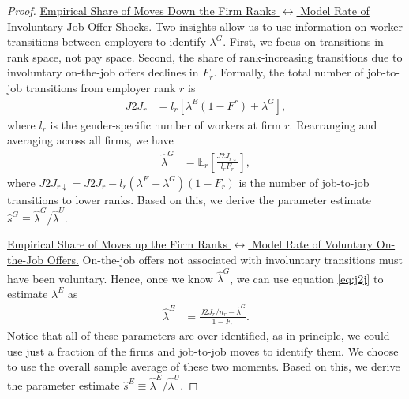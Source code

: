 \begin{proof}
    \uline{Empirical Share of Moves Down the Firm Ranks $\leftrightarrow$ Model Rate of Involuntary Job Offer Shocks.} %
    Two insights allow us to use information on worker transitions between employers to identify $\lambda^{G}$. First, we focus on transitions in rank space, not pay space. Second, the share of rank-increasing transitions due to involuntary on-the-job offers declines in $F_{r}$. Formally, the total number of job-to-job transitions from employer rank $r$ is
    \begin{align}
        J2J_{r} &= l_{r} [\lambda^{E} (1 - F^{r}) + \lambda^{G}], \label{eq:j2j}
    \end{align}
    where $l_{r}$ is the gender-specific number of workers at firm $r$. Rearranging and averaging across all firms, we have
    \begin{align}
        \hat{\lambda}^{G} &= \mathbb{E}_{r} \left[ \frac{ J2J_{r \downarrow}}{l_{r} {F}_{r}} \right],
    \end{align}
    where $J2J_{r \downarrow} = J2J_{r} - l_{r} (\lambda^{E} + \lambda^{G}) (1 - F_{r})$ is the number of job-to-job transitions to lower ranks. Based on this, we derive the parameter estimate $\hat{s}^{G} \equiv \hat{\lambda}^{G}/\hat{\lambda}^{U}$.

    \uline{Empirical Share of Moves up the Firm Ranks $\leftrightarrow$ Model Rate of Voluntary On-the-Job Offers.} %
    On-the-job offers not associated with involuntary transitions must have been voluntary. Hence, once we know $\hat{\lambda}^{G}$, we can use equation \eqref{eq:j2j} to estimate $\lambda^{E}$ as
    \begin{align}
        \hat{\lambda}^{E} &= \frac{J2J_{r}/n_{r} - \hat{\lambda}^{G}}{1 - {F}_{r}}.
    \end{align}
    Notice that all of these parameters are over-identified, as in principle, we could use just a fraction of the firms and job-to-job moves to identify them. We choose to use the overall sample average of these two moments. Based on this, we derive the parameter estimate $\hat{s}^{E} \equiv \hat{\lambda}^{E}/\hat{\lambda}^{U}$.


\end{proof}
